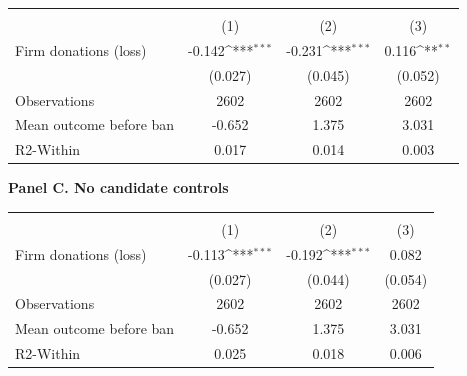 \documentclass[12pt,a4paper]{article}
\begin{document}
\begin{table}[H]
{
\def\sym#1{\ifmmode^{#1}\else\(^{#1}\)\fi}
\begin{tabular}{l*{3}{c}}
\hline\hline
                &&&\\\cmidrule(lr){2-2}\cmidrule(lr){3-3}\cmidrule(lr){4-4}
                &         &         &         \\
\hline
Firm donations (loss)&   -0.142\sym{***}&   -0.231\sym{***}&    0.116\sym{**} \\
                &  (0.027)         &  (0.045)         &  (0.052)         \\
\hline
Observations    &     2602         &     2602         &     2602         \\
Mean outcome before ban&   -0.652         &    1.375         &    3.031         \\
R2-Within       &    0.017         &    0.014         &    0.003         \\
\hline\hline
\end{tabular}
}

\bigskip
\textbf{Panel C. No candidate controls}\\[1mm]

{
\def\sym#1{\ifmmode^{#1}\else\(^{#1}\)\fi}
\begin{tabular}{l*{3}{c}}
\hline\hline
                &&&\\\cmidrule(lr){2-2}\cmidrule(lr){3-3}\cmidrule(lr){4-4}
                &         &         &         \\
\hline
Firm donations (loss)&   -0.113\sym{***}&   -0.192\sym{***}&    0.082         \\
                &  (0.027)         &  (0.044)         &  (0.054)         \\
\hline
Observations    &     2602         &     2602         &     2602         \\
Mean outcome before ban&   -0.652         &    1.375         &    3.031         \\
R2-Within       &    0.025         &    0.018         &    0.006         \\
\hline\hline
\end{tabular}
}


\end{table}
\end{document}
